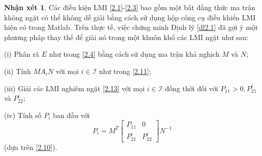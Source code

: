 \documentclass[12pt,a4paper]{report}
\theoremstyle{definition}
\newtheorem{nx}{Nhận xét}
\theoremstyle{definition}
\numberwithin{dl}{chapter}
\numberwithin{vd}{chapter}
\numberwithin{corollary}{chapter}
\numberwithin{lemma}{chapter}
\numberwithin{md}{chapter}
\numberwithin{dn}{chapter}
\numberwithin{cy}{chapter}
\numberwithin{nx}{chapter}
\begin{document}
\begin{nx}\label{Nx4}  Các điều kiện LMI \eqref{2.1}-\eqref{2.3} bao gồm một bất đẳng thức ma trận không ngặt có thể không dễ giải bằng cách sử dụng hộp công cụ điều khiển LMI hiện có trong Matlab. Trên thực tế, việc chứng minh Định lý \ref{dl2.1} đã gợi ý một phương pháp thay thế để giải nó trong một khuôn khổ các LMI ngặt như sau:

(i) Phân rã $E$ như trong \eqref{2.4} bằng cách sử dụng ma trận khả nghịch $M$ và $N$;

(ii) Tính $M A_{i} N$ với mọi $i \in \mathcal{I}$ như trong \eqref{2.11};

(iii) Giải các LMI nghiêm ngặt \eqref{2.13} với mọi $i \in \mathcal{I}$ đồng thời đối với $P_{11}>0, P_{21}^{i}$ và $P_{22}^{i}$;

(iv) Tính số $P_{i}$ ban đầu với
$$
P_{i}=M^{T}\left[\begin{array}{cc}
P_{11} & 0 \\
P_{21}^{i} & P_{22}^{i}
\end{array}\right] N^{-1}
$$
(dựa trên \eqref{2.10}).\\
\end{nx} 
\end{document}
